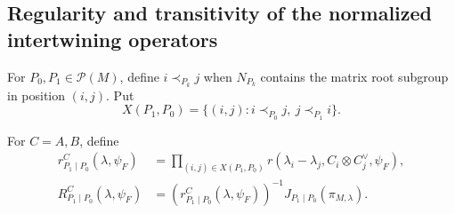 \documentclass[11pt,reqno]{amsart}
\theoremstyle{plain}
\theoremstyle{definition}
\numberwithin{equation}{subsection}
\begin{document}
\subsection{Regularity and transitivity of the normalized intertwining operators}
\label{akms-reg:sec:analytic}
For $P_0,P_1\in\mathcal P(M)$, define $i\prec_{P_k}j$ when
$N_{P_k}$ contains the matrix root subgroup in position $(i,j)$.
Put
\[
 X(P_1,P_0)=\{(i,j):i\prec_{P_0}j,\ j\prec_{P_1}i\}.
\]

For $C=A,B$, define
\begin{align*}
 r^C_{P_1\mid P_0}(\lambda,\psi_F)
 &=\prod_{(i,j)\in X(P_1,P_0)}
 r(\lambda_i-\lambda_j,C_i\otimes C_j^\vee,\psi_F),\\
 R^C_{P_1\mid P_0}(\lambda,\psi_F)
 &=(r^C_{P_1\mid P_0}(\lambda,\psi_F))^{-1}
 J_{P_1\mid P_0}(\pi_{M,\lambda}).
\end{align*}
\end{document}
